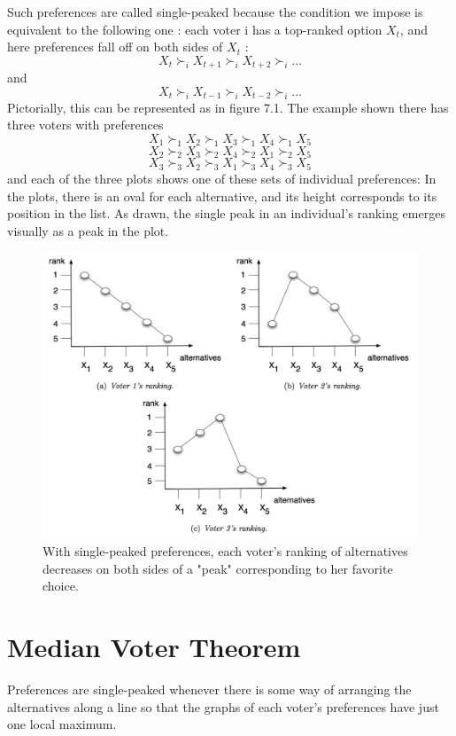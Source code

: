 \documentclass[twoside]{article}
\begin{document}
Such preferences are called single-peaked because the condition we impose is equivalent to the following one : each voter i has a top-ranked option $X_t$, and here preferences fall off on both sides of $X_t$ : 
\[X_t \succ_i X_{t+1} \succ_i X_{t+2} \succ_i ... \]
and
\[X_t \succ_i X_{t-1} \succ_i X_{t-2} \succ_i ... \]
Pictorially, this can be represented as in figure 7.1. The example shown there has three voters with preferences
\newline
\[X_1 \succ_1 X_2 \succ_1 X_3 \succ_1 X_4 \succ_1 X_5 \]
\[X_2 \succ_2 X_3 \succ_2 X_4 \succ_2 X_1 \succ_2 X_5 \]
\[X_3 \succ_3 X_2 \succ_3 X_1 \succ_3 X_4 \succ_3 X_5 \]
\newline
and each of the three plots shows one of these sets of individual preferences: In the plots, there is an oval for each alternative, and its height corresponds to its position in the list. As drawn, the single peak in an individual's ranking emerges visually as a peak in the plot.

\begin{figure}[h]
\includegraphics[width=\textwidth]{image1}
\caption{With single-peaked preferences, each voter's ranking of alternatives decreases on both sides of a "peak" corresponding to her favorite choice.}
\label{fig:figure1}
\end{figure}

\section{Median Voter Theorem}

Preferences are single-peaked whenever there is some way of arranging the alternatives along a line so that the graphs of each voter's preferences have just one local maximum. 
\end{document}
